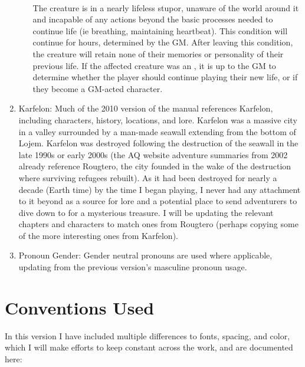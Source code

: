 \begin{enumerate}[leftmargin=12pt]
\begin{enumerate}
	\\
	The creature is in a nearly lifeless stupor, unaware of the world around it and incapable of any actions beyond the basic processes needed to continue life (ie breathing, maintaining heartbeat). This condition will continue for  hours, determined by the GM. After leaving this condition, the creature will retain none of their memories or personality of their previous life. If the affected creature was an , it is up to the GM to determine whether the player should continue playing their new life, or if they become a GM-acted character.
\end{enumerate}
\item Karfelon: Much of the 2010 version of the manual references Karfelon, including characters, history, locations, and lore. Karfelon was a massive city in a valley surrounded by a man-made seawall extending from the bottom of Lojem. Karfelon was destroyed following the destruction of the seawall in the late 1990s or early 2000s (the AQ website adventure summaries from 2002 already reference Rougtero, the city founded in the wake of the destruction where surviving refugees rebuilt). As it had been destroyed for nearly a decade (Earth time) by the time I began playing, I never had any attachment to it beyond as a source for lore and a potential place to send adventurers to dive down to for a mysterious treasure. I will be updating the relevant chapters and characters to match ones from Rougtero (perhaps copying some of the more interesting ones from Karfelon).
\item Pronoun Gender: Gender neutral pronouns are used where applicable, updating from the previous version's masculine pronoun usage.
\end{enumerate}
\section{Conventions Used}
In this version I have included multiple differences to fonts, spacing, and color, which I will make efforts to keep constant across the work, and are documented here:
